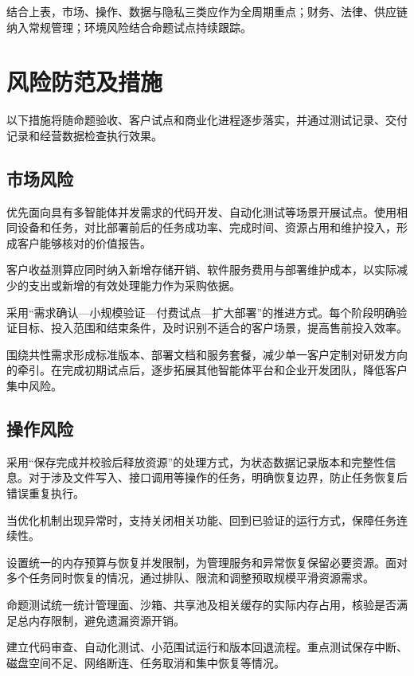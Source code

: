 结合上表，市场、操作、数据与隐私三类应作为全周期重点；财务、法律、供应链纳入常规管理；环境风险结合命题试点持续跟踪。

\section{风险防范及措施}\label{sec:7.2}
以下措施将随命题验收、客户试点和商业化进程逐步落实，并通过测试记录、交付记录和经营数据检查执行效果。

\subsection{市场风险}\label{sec:7.2.1}
优先面向具有多智能体并发需求的代码开发、自动化测试等场景开展试点。使用相同设备和任务，对比部署前后的任务成功率、完成时间、资源占用和维护投入，形成客户能够核对的价值报告。

客户收益测算应同时纳入新增存储开销、软件服务费用与部署维护成本，以实际减少的支出或新增的有效处理能力作为采购依据。

采用“需求确认---小规模验证---付费试点---扩大部署”的推进方式。每个阶段明确验证目标、投入范围和结束条件，及时识别不适合的客户场景，提高售前投入效率。

围绕共性需求形成标准版本、部署文档和服务套餐，减少单一客户定制对研发方向的牵引。在完成初期试点后，逐步拓展其他智能体平台和企业开发团队，降低客户集中风险。

\subsection{操作风险}\label{sec:7.2.2}
采用“保存完成并校验后释放资源”的处理方式，为状态数据记录版本和完整性信息。对于涉及文件写入、接口调用等操作的任务，明确恢复边界，防止任务恢复后错误重复执行。

当优化机制出现异常时，支持关闭相关功能、回到已验证的运行方式，保障任务连续性。

设置统一的内存预算与恢复并发限制，为管理服务和异常恢复保留必要资源。面对多个任务同时恢复的情况，通过排队、限流和调整预取规模平滑资源需求。

命题测试统一统计管理面、沙箱、共享池及相关缓存的实际内存占用，核验是否满足总内存限制，避免遗漏资源开销。

建立代码审查、自动化测试、小范围试运行和版本回退流程。重点测试保存中断、磁盘空间不足、网络断连、任务取消和集中恢复等情况。


